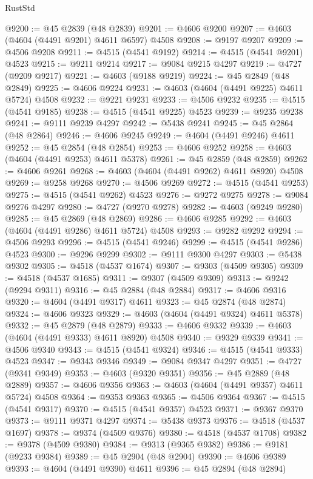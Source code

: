 \begin{lexlean}{RustStd}
\begin{coremodule}
@9200 := @45 @2839 (@48 @2839)
@9201 := @4606 @9200
@9207 := @4603 (@4604 (@4491 @9201) @4611 @6597) @4508
@9208 := @9197 @9207
@9209 := @4506 @9208
@9211 := @4515 (@4541 @9192)
@9214 := @4515 (@4541 @9201) @4523
@9215 := @9211 @9214
@9217 := @9084 @9215 @4297
@9219 := @4727 (@9209 @9217)
@9221 := @4603 (@9188 @9219)
@9224 := @45 @2849 (@48 @2849)
@9225 := @4606 @9224
@9231 := @4603 (@4604 (@4491 @9225) @4611 @5724) @4508
@9232 := @9221 @9231
@9233 := @4506 @9232
@9235 := @4515 (@4541 @9185)
@9238 := @4515 (@4541 @9225) @4523
@9239 := @9235 @9238
@9241 := @9111 @9239 @4297
@9242 := @5438 @9241
@9245 := @45 @2864 (@48 @2864)
@9246 := @4606 @9245
@9249 := @4604 (@4491 @9246) @4611
@9252 := @45 @2854 (@48 @2854)
@9253 := @4606 @9252
@9258 := @4603 (@4604 (@4491 @9253) @4611 @5378)
@9261 := @45 @2859 (@48 @2859)
@9262 := @4606 @9261
@9268 := @4603 (@4604 (@4491 @9262) @4611 @8920) @4508
@9269 := @9258 @9268
@9270 := @4506 @9269
@9272 := @4515 (@4541 @9253)
@9275 := @4515 (@4541 @9262) @4523
@9276 := @9272 @9275
@9278 := @9084 @9276 @4297
@9280 := @4727 (@9270 @9278)
@9282 := @4603 (@9249 @9280)
@9285 := @45 @2869 (@48 @2869)
@9286 := @4606 @9285
@9292 := @4603 (@4604 (@4491 @9286) @4611 @5724) @4508
@9293 := @9282 @9292
@9294 := @4506 @9293
@9296 := @4515 (@4541 @9246)
@9299 := @4515 (@4541 @9286) @4523
@9300 := @9296 @9299
@9302 := @9111 @9300 @4297
@9303 := @5438 @9302
@9305 := @4518 (@4537 @1674)
@9307 := @9303 (@4509 @9305)
@9309 := @4518 (@4537 @1685)
@9311 := @9307 (@4509 @9309)
@9313 := @9242 (@9294 @9311)
@9316 := @45 @2884 (@48 @2884)
@9317 := @4606 @9316
@9320 := @4604 (@4491 @9317) @4611
@9323 := @45 @2874 (@48 @2874)
@9324 := @4606 @9323
@9329 := @4603 (@4604 (@4491 @9324) @4611 @5378)
@9332 := @45 @2879 (@48 @2879)
@9333 := @4606 @9332
@9339 := @4603 (@4604 (@4491 @9333) @4611 @8920) @4508
@9340 := @9329 @9339
@9341 := @4506 @9340
@9343 := @4515 (@4541 @9324)
@9346 := @4515 (@4541 @9333) @4523
@9347 := @9343 @9346
@9349 := @9084 @9347 @4297
@9351 := @4727 (@9341 @9349)
@9353 := @4603 (@9320 @9351)
@9356 := @45 @2889 (@48 @2889)
@9357 := @4606 @9356
@9363 := @4603 (@4604 (@4491 @9357) @4611 @5724) @4508
@9364 := @9353 @9363
@9365 := @4506 @9364
@9367 := @4515 (@4541 @9317)
@9370 := @4515 (@4541 @9357) @4523
@9371 := @9367 @9370
@9373 := @9111 @9371 @4297
@9374 := @5438 @9373
@9376 := @4518 (@4537 @1697)
@9378 := @9374 (@4509 @9376)
@9380 := @4518 (@4537 @1708)
@9382 := @9378 (@4509 @9380)
@9384 := @9313 (@9365 @9382)
@9386 := @9181 (@9233 @9384)
@9389 := @45 @2904 (@48 @2904)
@9390 := @4606 @9389
@9393 := @4604 (@4491 @9390) @4611
@9396 := @45 @2894 (@48 @2894)

\end{coremodule}
\end{lexlean}
